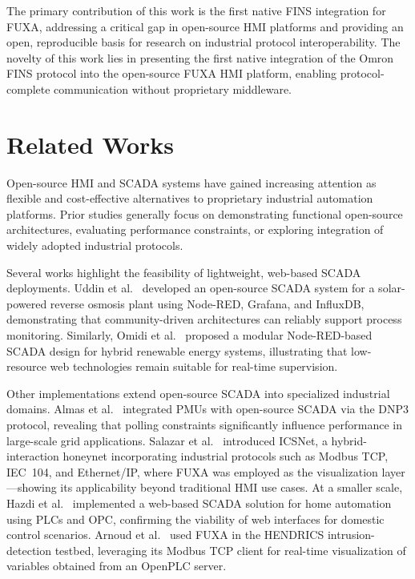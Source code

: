 The primary contribution of this work is the first native FINS integration for FUXA, addressing a critical gap in open-source HMI platforms and providing an open, reproducible basis for research on industrial protocol interoperability. The novelty of this work lies in presenting the first native integration of the Omron FINS protocol into the open-source FUXA HMI platform, enabling protocol-complete communication without proprietary middleware.

\section{Related Works}

Open-source HMI and SCADA systems have gained increasing attention as flexible and cost-effective alternatives to proprietary industrial automation platforms. Prior studies generally focus on demonstrating functional open-source architectures, evaluating performance constraints, or exploring integration of widely adopted industrial protocols.

Several works highlight the feasibility of lightweight, web-based SCADA deployments. Uddin et al.~\cite{uddin2022open} developed an open-source SCADA system for a solar-powered reverse osmosis plant using Node-RED, Grafana, and InfluxDB, demonstrating that community-driven architectures can reliably support process monitoring. Similarly, Omidi et al.~\cite{omidi2023node} proposed a modular Node-RED-based SCADA design for hybrid renewable energy systems, illustrating that low-resource web technologies remain suitable for real-time supervision.

Other implementations extend open-source SCADA into specialized industrial domains. Almas et al.~\cite{almas2014open} integrated PMUs with open-source SCADA via the DNP3 protocol, revealing that polling constraints significantly influence performance in large-scale grid applications. Salazar et al.~\cite{salazar2024icsnet} introduced ICSNet, a hybrid-interaction honeynet incorporating industrial protocols such as Modbus TCP, IEC~104, and Ethernet/IP, where FUXA was employed as the visualization layer—showing its applicability beyond traditional HMI use cases. At a smaller scale, Hazdi et al.~\cite{hazdi2017scada} implemented a web-based SCADA solution for home automation using PLCs and OPC, confirming the viability of web interfaces for domestic control scenarios. Arnoud et al.~\cite{arnoud:hal-05325191} used FUXA in the HENDRICS intrusion-detection testbed, leveraging its Modbus TCP client for real-time visualization of variables obtained from an OpenPLC server.

